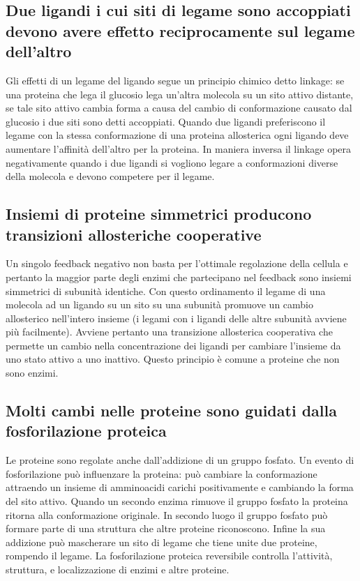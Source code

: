 \subsection{Due ligandi i cui siti di legame sono accoppiati devono avere effetto reciprocamente sul legame dell'altro}
Gli effetti di un legame del ligando segue un principio chimico detto linkage: se una proteina che lega il glucosio lega un'altra molecola su un sito attivo distante, se tale sito
attivo cambia forma a causa del cambio di conformazione causato dal glucosio i due siti sono detti accoppiati. Quando due ligandi preferiscono il legame con la stessa conformazione di
una proteina allosterica ogni ligando deve aumentare l'affinit\`a dell'altro per la proteina. In maniera inversa il linkage opera negativamente quando i due ligandi si vogliono legare
a conformazioni diverse della molecola e devono competere per il legame. 
\subsection{Insiemi di proteine simmetrici producono transizioni allosteriche cooperative}
Un singolo feedback negativo non basta per l'ottimale regolazione della cellula e pertanto la maggior parte degli enzimi che partecipano nel feedback sono insiemi simmetrici di 
subunit\`a identiche. Con questo ordinamento il legame di una molecola ad un ligando su un sito su una subunit\`a promuove un cambio allosterico nell'intero insieme (i legami con i 
ligandi delle altre subunit\`a avviene pi\`u facilmente). Avviene pertanto una transizione allosterica cooperativa che permette un cambio nella concentrazione dei ligandi per cambiare 
l'insieme da uno stato attivo a uno inattivo. Questo principio \`e comune a proteine che non sono enzimi. 
\subsection{Molti cambi nelle proteine sono guidati dalla fosforilazione proteica}
Le proteine sono regolate anche dall'addizione di un gruppo fosfato. Un evento di fosforilazione pu\`o influenzare la proteina: pu\`o cambiare la conformazione attraendo un insieme
di amminoacidi carichi positivamente e cambiando la forma del sito attivo. Quando un secondo enzima rimuove il gruppo fosfato la proteina ritorna alla conformazione originale. In 
secondo luogo il gruppo fosfato pu\`o formare parte di una struttura che altre proteine riconoscono. Infine la sua addizione pu\`o mascherare un sito di legame che tiene unite 
due proteine, rompendo il legame. La fosforilazione proteica reversibile controlla l'attivit\`a, struttura, e localizzazione di enzimi e altre proteine. 
